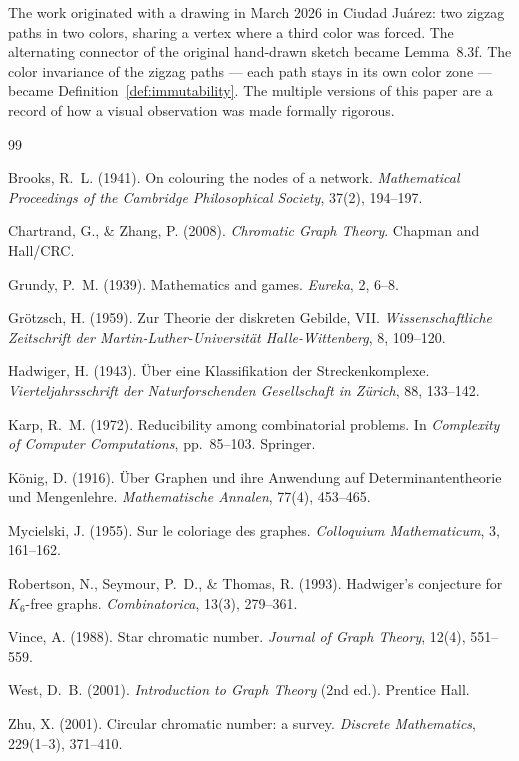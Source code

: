 \documentclass[12pt,a4paper]{article}
\theoremstyle{definition}
\begin{document}
The work originated with a drawing in March 2026 in Ciudad Ju\'arez:
two zigzag paths in two colors, sharing a vertex where a third color was
forced. The alternating connector of the original hand-drawn sketch became
Lemma~8.3f. The color invariance of the zigzag paths --- each path stays
in its own color zone --- became Definition~\ref{def:immutability}.
The multiple versions of this paper are a record of how a visual
observation was made formally rigorous.

\begin{thebibliography}{99}

Brooks, R.~L. (1941).
On colouring the nodes of a network.
\textit{Mathematical Proceedings of the Cambridge Philosophical Society},
37(2), 194--197.

Chartrand, G., \& Zhang, P. (2008).
\textit{Chromatic Graph Theory}.
Chapman and Hall/CRC.

Grundy, P.~M. (1939).
Mathematics and games.
\textit{Eureka}, 2, 6--8.

Gr\"otzsch, H. (1959).
Zur Theorie der diskreten Gebilde, VII.
\textit{Wissenschaftliche Zeitschrift der Martin-Luther-Universit\"at
Halle-Wittenberg}, 8, 109--120.

Hadwiger, H. (1943).
\"Uber eine Klassifikation der Streckenkomplexe.
\textit{Vierteljahrsschrift der Naturforschenden Gesellschaft in
Z\"urich}, 88, 133--142.

Karp, R.~M. (1972).
Reducibility among combinatorial problems.
In \textit{Complexity of Computer Computations}, pp.~85--103. Springer.

K\"onig, D. (1916).
\"Uber Graphen und ihre Anwendung auf Determinantentheorie und
Mengenlehre.
\textit{Mathematische Annalen}, 77(4), 453--465.

Mycielski, J. (1955).
Sur le coloriage des graphes.
\textit{Colloquium Mathematicum}, 3, 161--162.

Robertson, N., Seymour, P.~D., \& Thomas, R. (1993).
Hadwiger's conjecture for $K_6$-free graphs.
\textit{Combinatorica}, 13(3), 279--361.

Vince, A. (1988).
Star chromatic number.
\textit{Journal of Graph Theory}, 12(4), 551--559.

West, D.~B. (2001).
\textit{Introduction to Graph Theory} (2nd ed.).
Prentice Hall.

Zhu, X. (2001).
Circular chromatic number: a survey.
\textit{Discrete Mathematics}, 229(1--3), 371--410.

\end{thebibliography}
\end{document}
